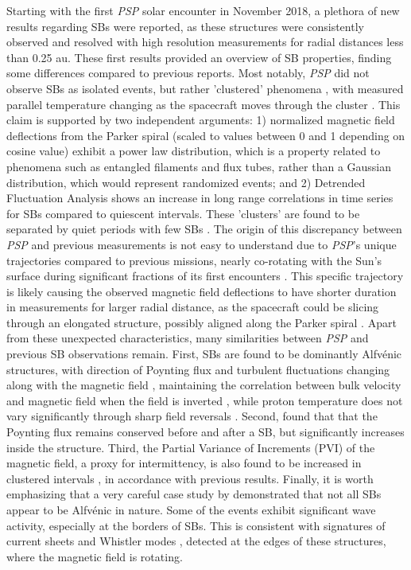 \documentclass[]{aastex62}
\begin{document}
Starting with the first \emph{PSP} solar encounter in November 2018, a plethora of new results regarding SBs were reported, as these structures were consistently observed and resolved with high resolution measurements for radial distances less than 0.25 au. These first results provided an overview of SB properties, finding some differences compared to previous reports. Most notably, \emph{PSP} did not observe SBs as isolated events, but rather 'clustered' phenomena \citep{DudokdeWit_2020_ApJS}, with measured parallel temperature changing as the spacecraft moves through the cluster \citep{Woodham_2020_arXiv}. This claim is supported by two independent arguments: 1) normalized magnetic field deflections from the Parker spiral (scaled to values between 0 and 1 depending on cosine value) exhibit a power law distribution, which is a property related to phenomena such as entangled filaments and flux tubes, rather than a Gaussian distribution, which would represent randomized events; and 2) Detrended Fluctuation Analysis \citep{Kantelhardt_2001_PhyA} shows an increase in long range correlations in time series for SBs compared to quiescent intervals. These 'clusters' are found to be separated by quiet periods with few SBs \citep{Horbury_2020_ApJS}. The origin of this discrepancy between \emph{PSP} and previous measurements is not easy to understand due to \emph{PSP}'s unique trajectories compared to previous missions, nearly co-rotating with the Sun's surface during significant fractions of its first encounters \citep{Bale_2019_Nature,Badman_2020_ApJS,Rouillard_2020_ApJS}. This specific trajectory is likely causing the observed magnetic field deflections to have shorter duration in measurements for larger radial distance, as the spacecraft could be slicing through an elongated structure, possibly aligned along the Parker spiral \citep{Laker_2020_arXiv}. Apart from these unexpected characteristics, many similarities between \emph{PSP} and previous SB observations remain. First, SBs are found to be dominantly Alfv\'enic structures, with direction of Poynting flux and turbulent fluctuations changing along with the magnetic field \citep{McManus_2020_ApJS,Bourouaine_2020_ApjL,Mozer_2020_ApJS}, maintaining the correlation between bulk velocity and magnetic field when the field is inverted \citep{Matteini_2014_GRL}, while proton temperature does not vary significantly through sharp field reversals \citep{Wooley_2020_MNRAS}. Second, \cite{Mozer_2020_ApJS} found that that the Poynting flux remains conserved before and after a SB, but significantly increases inside the structure. Third, the Partial Variance of Increments (PVI) of the magnetic field, a proxy for intermittency, is also found to be increased in clustered intervals \citep{Chhiber_2020_ApJS}, in accordance with previous results. Finally, it is worth emphasizing that a very careful case study by \cite{Krasnoselskikh_2020_ApJ} demonstrated that not all SBs appear to be Alfv\'enic in nature. Some of the events exhibit significant wave activity, especially at the borders of SBs. This is consistent with signatures of current sheets \citep{Farrell_2020_ApJS} and Whistler modes \citep{Agapitov_2020_ApJL}, detected at the edges of these structures, where the magnetic field is rotating. 
\end{document}
